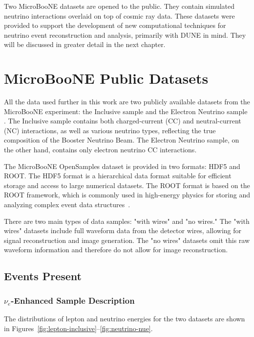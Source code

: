 \documentclass{pracalicmgr}
\begin{document}
Two MicroBooNE datasets are opened to the public. They contain simulated neutrino interactions overlaid on top of cosmic ray data. These datasets were provided to support the development of new computational techniques for neutrino event reconstruction and analysis, primarily with DUNE in mind. They will be discussed in greater detail in the next chapter.

\chapter{MicroBooNE Public Datasets}

All the data used further in this work are two publicly available datasets from the MicroBooNE experiment: the Inclusive sample and the Electron Neutrino sample \cite{ubooneOpenSamples}. The Inclusive sample contains both charged-current (CC) and neutral-current (NC) interactions, as well as various neutrino types, reflecting the true composition of the Booster Neutrino Beam. The Electron Neutrino sample, on the other hand, contains only electron neutrino CC interactions.

The MicroBooNE OpenSamples dataset is provided in two formats: HDF5 and ROOT. The HDF5 format is a hierarchical data format suitable for efficient storage and access to large numerical datasets. The ROOT format is based on the ROOT framework, which is commonly used in high-energy physics for storing and analyzing complex event data structures~\cite{hdf5,root}. 

There are two main types of data samples: "with wires" and "no wires." The "with wires" datasets include full waveform data from the detector wires, allowing for signal reconstruction and image generation. The "no wires" datasets omit this raw waveform information and therefore do not allow for image reconstruction.

\section{Events Present}

\subsection{\texorpdfstring{$\nu_e$}{νₑ}-Enhanced Sample Description}

The distributions of lepton and neutrino energies for the two datasets are shown in Figures~\ref{fig:lepton-inclusive}--\ref{fig:neutrino-nue}. 
\end{document}

